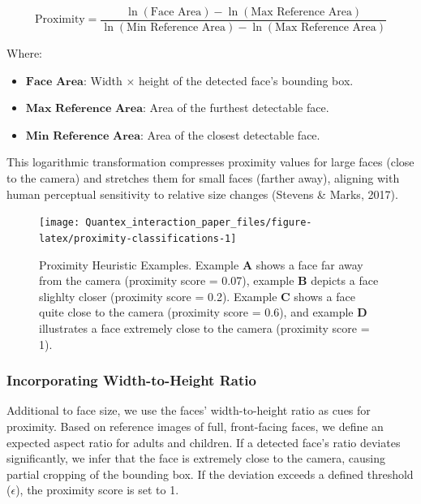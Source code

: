\documentclass[
  man,floatsintext]{apa6}
\providecommand{\tightlist}{%
  \setlength{\itemsep}{0pt}\setlength{\parskip}{0pt}}
\begin{document}
\[
\text{Proximity} = \frac{\ln(\text{Face Area}) - \ln(\text{Max Reference Area})}{\ln(\text{Min Reference Area}) - \ln(\text{Max Reference Area})}
\]

Where:

\begin{itemize}
\tightlist
\item
  \(\textbf{Face Area}\): Width × height of the detected face's bounding box.
\item
  \(\textbf{Max Reference Area}\): Area of the furthest detectable face.
\item
  \(\textbf{Min Reference Area}\): Area of the closest detectable face.
\end{itemize}

This logarithmic transformation compresses proximity values for large faces (close to the camera) and stretches them for small faces (farther away), aligning with human perceptual sensitivity to relative size changes (Stevens \& Marks, 2017).

\begin{figure}

{\centering \texttt{[image: Quantex\_interaction\_paper\_files/figure-latex/proximity-classifications-1]} 

}

\caption{Proximity Heuristic Examples. Example \textbf{A} shows a face far away from the camera (proximity score = 0.07), example \textbf{B} depicts a face slighlty closer (proximity score = 0.2). Example \textbf{C} shows a face quite close to the camera (proximity score = 0.6), and example \textbf{D} illustrates a face extremely close to the camera (proximity score = 1).}\label{fig:proximity-classifications}
\end{figure}

\subsubsection{Incorporating Width-to-Height Ratio}\label{incorporating-width-to-height-ratio}

Additional to face size, we use the faces' width-to-height ratio as cues for proximity.
Based on reference images of full, front-facing faces, we define an expected aspect ratio for adults and children. If a detected face's ratio deviates significantly, we infer that the face is extremely close to the camera, causing partial cropping of the bounding box. If the deviation exceeds a defined threshold (\(\epsilon\)), the proximity score is set to 1.
\end{document}
